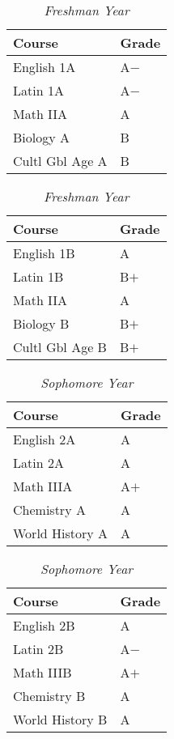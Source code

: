 \documentclass[12pt]{article}
\renewcommand{\it}[1]{\textit{{#1}}}
\begin{document}
\begin{table}[H]
  \centering
  \caption*{\it{Freshman Year}}
  \vspace{-0.8em}
  \begin{tabular}{l|l}
    Course          & Grade \\
    \hline
    English 1A      & A$-$  \\
    Latin 1A        & A$-$  \\
    Math IIA        & A   \\
    Biology A       & B   \\
    Cultl Gbl Age A & B   \\
  \end{tabular}
  \hspace{2em}
  \begin{tabular}{l|l}
    Course      & Grade \\
    \hline
    English 1B      & A   \\
    Latin 1B        & B$+$  \\
    Math IIA        & A   \\
    Biology B       & B$+$  \\
    Cultl Gbl Age B & B$+$  \\
  \end{tabular}
  \vspace{-1em}
\end{table}

\begin{table}[H]
  \centering
  \caption*{\it{Sophomore Year}}
  \vspace{-0.8em}
  \begin{tabular}{l|l}
    Course          & Grade \\
    \hline
    English 2A      & A   \\
    Latin 2A        & A   \\
    Math IIIA       & A$+$  \\
    Chemistry A     & A   \\
    World History A & A   \\
  \end{tabular}
  \hspace{2em}
  \begin{tabular}{l|l}
    Course          & Grade \\
    \hline
    English 2B      & A   \\
    Latin 2B        & A$-$  \\
    Math IIIB       & A$+$  \\
    Chemistry B     & A   \\
    World History B & A   \\
  \end{tabular}
  \vspace{-1em}
\end{table}
\end{document}
